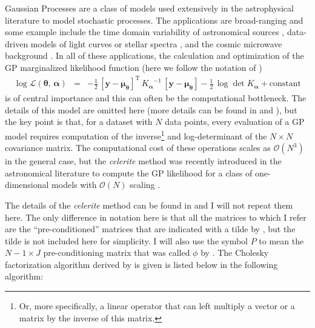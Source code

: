 \documentclass[rnaas]{aastex62}
\newcommand{\eqlabel}[1]{\label{eq:#1}}
\newcommand{\T}{\ensuremath{\mathrm{T}}}
\newcommand{\bvec}[1]{{\ensuremath{\boldsymbol{#1}}}}
\begin{document}
Gaussian Processes \citep[GPs][]{Rasmussen:2006} are a class of models used
extensively in the astrophysical literature to model stochastic processes.
The applications are broad-ranging and some example include the time domain
variability of astronomical sources \citep{Brewer:2009, Kelly:2014,
Haywood:2014, Rajpaul:2015, Foreman-Mackey:2017}, data-driven models of light
curves or stellar spectra \citep{Wang:2012, Luger:2016, Czekala:2017}, and the
cosmic microwave background \citep{Bond:1987,Wandelt:2003}.
In all of these applications, the calculation and optimization of the GP
marginalized likelihood function (here we follow the notation of
\citealt{Foreman-Mackey:2017})
\begin{eqnarray}\eqlabel{loglike}
\log \mathcal{L}(\bvec{\theta},\,\bvec{\alpha}) &=&
    -\frac{1}{2}\,\left[\bvec{y} - \bvec{\mu}_\bvec{\theta}\right]^\T\,
        {K_\bvec{\alpha}}^{-1}\,\left[\bvec{y}-\bvec{\mu}_\bvec{\theta}\right]
    -\frac{1}{2}\,\log\det K_\bvec{\alpha} + \mathrm{constant}
\end{eqnarray}
is of central importance and this can often be the computational bottleneck.
The details of this model are omitted here (more details can be found in
\citealt{Rasmussen:2006} and \citealt{Foreman-Mackey:2017}), but the key point
is that, for a dataset with $N$ data points, every evaluation of a GP model
requires computation of the inverse\footnote{Or, more specifically, a linear
operator that can left multiply a vector or a matrix by the inverse of this
matrix.} and log-determinant of the $N \times N$ covariance matrix.
The computational cost of these operations scales as $\mathcal{O}(N^3)$ in the
general case, but the \emph{celerite} method was recently introduced in the
astronomical literature to compute the GP likelihood for a class of
one-dimensional models with $\mathcal{O}(N)$ scaling
\citep{Foreman-Mackey:2017}.

The details of the \emph{celerite} method can be found in
\citet{Foreman-Mackey:2017} and I will not repeat them here.
The only difference in notation here is that all the matrices to which I refer
are the ``pre-conditioned'' matrices that are indicated with a tilde by
\citet{Foreman-Mackey:2017}, but the tilde is not included here for
simplicity.
I will also use the symbol $P$ to mean the $N-1 \times J$ pre-conditioning
matrix that was called $\phi$ by \citet{Foreman-Mackey:2017}.
The Cholesky factorization algorithm derived by \citet[][their
Equation~46]{Foreman-Mackey:2017} is given is listed below in the following
algorithm:
\end{document}
